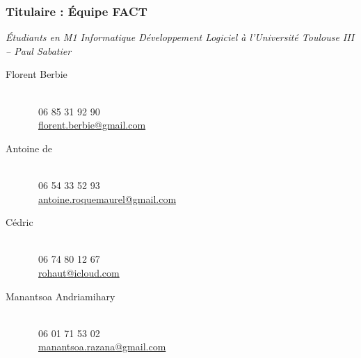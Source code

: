 	\subsubsection{Titulaire : Équipe FACT}
	\textit{Étudiants en M1 Informatique Développement Logiciel à l'Université Toulouse III -- Paul Sabatier}
	\begin{description}
		\item[Florent Berbie]~ \\
	\Telefon~06 85 31 92 90 \\
	\Letter~\href{mailto:florent.berbie@gmail.com}{florent.berbie@gmail.com} \\
	
\item[Antoine de ] ~\\
	\Telefon~06 54 33 52 93\\
	\Letter~\href{mailto:antoine.roquemaurel@gmail.com}{antoine.roquemaurel@gmail.com} \\
	
\item[Cédric ]~\\ 
	\Telefon~06 74 80 12 67\\
	\Letter~\href{mailto:rohaut@icloud.com}{rohaut@icloud.com} \\
	
\item[Manantsoa Andriamihary ] ~\\
	\Telefon~06 01 71 53 02\\
	\Letter~\href{mailto:manantsoa.razana@gmail.com}{manantsoa.razana@gmail.com}
\end{description}



